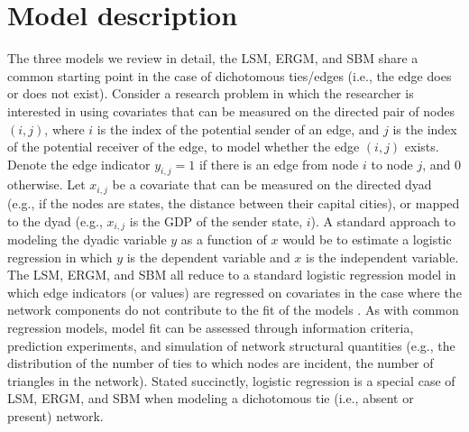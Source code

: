 \documentclass[fleqn,12pt]{wlscirep}
\begin{document}
\section{Model description}

The three models we review in detail, the LSM, ERGM, and SBM share a common starting point in the case of dichotomous ties/edges (i.e., the edge does or does not exist). Consider a research problem in which the researcher is interested in using covariates that can be measured on the directed pair of nodes $(i,j)$, where $i$ is the index of the potential sender of an edge, and $j$ is the index of the potential receiver of the edge, to model whether the edge $(i,j)$ exists. Denote the edge indicator $y_{i,j} = 1$  if there is an edge from node $i$ to node $j$, and 0 otherwise. Let $x_{i,j}$ be a covariate that can be measured on the directed dyad (e.g., if the nodes are states, the distance between their capital cities), or mapped to the dyad (e.g., $x_{i,j}$ is the GDP of the sender state, $i$). A standard approach to modeling the dyadic variable $y$ as a function of $x$ would be to estimate a logistic regression in which $y$ is the dependent variable and $x$ is the independent variable. The LSM, ERGM, and SBM all reduce to a standard logistic regression model in which edge indicators (or values) are regressed on covariates in the case where the network components do not contribute to the fit of the models \citep{lubbers2007comparison,raftery2012fast,sweet2015incorporating}. As with common regression models, model fit can be assessed through information criteria, prediction experiments, and simulation of network structural quantities (e.g., the distribution of the number of ties to which nodes are incident, the number of triangles in the network). Stated succinctly, logistic regression is a special case of LSM, ERGM, and SBM when modeling a dichotomous tie (i.e., absent or present) network. 
\end{document}
